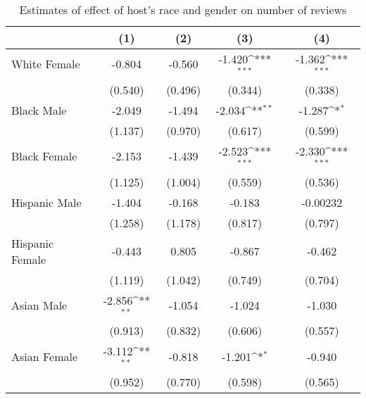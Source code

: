 {
\def\sym#1{\ifmmode^{#1}\else\(^{#1}\)\fi}
\begin{longtable}{l*{4}{c}}
\caption{Estimates of effect of host's race and gender on number of reviews}\\
\hline\hline\endfirsthead\hline\endhead\hline\endfoot\endlastfoot
                    &\multicolumn{1}{c}{(1)}&\multicolumn{1}{c}{(2)}&\multicolumn{1}{c}{(3)}&\multicolumn{1}{c}{(4)}\\
\hline
White Female        &      -0.804         &      -0.560         &      -1.420\sym{***}&      -1.362\sym{***}\\
                    &     (0.540)         &     (0.496)         &     (0.344)         &     (0.338)         \\
[1em]
Black Male          &      -2.049         &      -1.494         &      -2.034\sym{**} &      -1.287\sym{*}  \\
                    &     (1.137)         &     (0.970)         &     (0.617)         &     (0.599)         \\
[1em]
Black Female        &      -2.153         &      -1.439         &      -2.523\sym{***}&      -2.330\sym{***}\\
                    &     (1.125)         &     (1.004)         &     (0.559)         &     (0.536)         \\
[1em]
Hispanic Male       &      -1.404         &      -0.168         &      -0.183         &    -0.00232         \\
                    &     (1.258)         &     (1.178)         &     (0.817)         &     (0.797)         \\
[1em]
Hispanic Female     &      -0.443         &       0.805         &      -0.867         &      -0.462         \\
                    &     (1.119)         &     (1.042)         &     (0.749)         &     (0.704)         \\
[1em]
Asian Male          &      -2.856\sym{**} &      -1.054         &      -1.024         &      -1.030         \\
                    &     (0.913)         &     (0.832)         &     (0.606)         &     (0.557)         \\
[1em]
Asian Female        &      -3.112\sym{**} &      -0.818         &      -1.201\sym{*}  &      -0.940         \\
                    &     (0.952)         &     (0.770)         &     (0.598)         &     (0.565)         \\

\end{longtable}}
